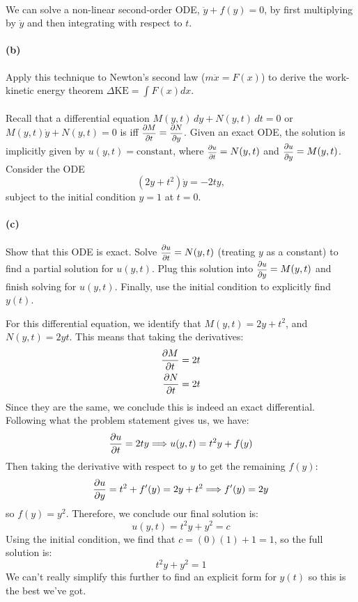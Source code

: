 \documentclass{article}
\begin{document}
\phline
\paragraph{}
We can solve a non-linear second-order ODE, $\ddot{y} + f(y) = 0$, by first multiplying by $\dot{y}$ and then integrating with respect to $t$. 

\paragraph{(b)}		\extrapart
Apply this technique to Newton's second law ($m\ddot{x} = F(x)$) to derive the work-kinetic energy theorem $\Delta \textrm{KE} = \int F(x)dx$.


\phline
\paragraph{}
Recall that a differential equation $M(y,t)\,dy + N(y,t)\,dt=0$ or $M(y,t)\dot{y} + N(y,t) = 0$ is  iff $\scalemath{0.8}{\pdiff{M}{t}} = \scalemath{0.8}{\pdiff{N}{y}}$.  
Given an exact ODE, the solution is implicitly given by $u(y,t)=\textrm{constant}$, where $\scalemath{0.8}{\pdiffsm{u}{t}} = N(y,t)$ and $\scalemath{0.8}{\pdiff{u}{y}} = M(y,t)$.
Consider the ODE
	\begin{equation*}
		(2y+t^{2})\dot{y} = -2ty,
	\end{equation*}
subject to the initial condition $y=1$ at $t=0$.

\paragraph{(c)}
Show that this ODE is exact.  Solve $\scalemath{0.8}{\pdiff{u}{t}} = N(y,t)$ (treating $y$ as a constant) to find a partial solution for $u(y,t)$.  
Plug this solution into $\scalemath{0.8}{\pdiff{u}{y}} = M(y,t)$ and finish solving for $u(y,t)$.
Finally, use the initial condition to explicitly find $y(t)$.

\begin{solution}
	For this differential equation, we identify that $M(y, t) = 2y + t^2$, and $N(y, t) = 2yt$. This means 
	that taking the derivatives:
	\begin{align*}
		\pdv{M}{t} &= 2t\\
		\pdv{N}{t} &= 2t
	\end{align*}
	Since they are the same, we conclude this is indeed an exact differential. Following what the problem 
	statement gives us, we have:
	\[
		\pdv{u}{t} = 2ty \Longrightarrow u(y, t) = t^2 y + f(y)
	\] 
	Then taking the derivative with respect to $y$ to get the remaining $f(y)$:
	\[
		\pdv{u}{y} = t^2 + f'(y) = 2y + t^2 \Longrightarrow f'(y) = 2y
	\] 
	so $f(y) = y^2$. Therefore, we conclude our final solution is:
	\[
		u(y, t) = t^2y + y^2 = c
	\] 
	Using the initial condition, we find that $c = (0)(1) + 1 = 1$, so the full solution is:
	\[
	t^2 y + y^2 = 1
	\] 
	We can't really simplify this further to find an explicit form for $y(t)$ so this is the best we've got. 
\end{solution}
\end{document}
